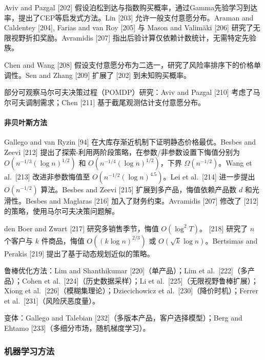 Aviv and Pazgal {[}202{]} 假设泊松到达与指数购买概率，通过Gamma先验学习到达率，提出了CEP等启发式方法。Lin {[}203{]} 允许一般支付意愿分布。Araman and Caldentey {[}204{]}, Farias and van Roy {[}205{]} 与 Mason and Valimäki {[}206{]} 研究了无限视野折扣奖励。Avramidis {[}207{]} 指出后验计算仅依赖计数统计，无需特定先验族。

Chen and Wang {[}208{]} 假设支付意愿分布为二选一，研究了风险率排序下的价格单调性。Sen and Zhang {[}209{]} 扩展了 {[}202{]} 到未知购买概率。

部分可观察马尔可夫决策过程（POMDP）研究：Aviv and Pazgal {[}210{]} 考虑了马尔可夫调制需求；Chen {[}211{]} 基于截尾观测估计支付意愿分布。

\paragraph{非贝叶斯方法}\label{non-bayesian-approaches-1}

Gallego and van Ryzin {[}94{]} 在大库存渐近机制下证明静态价格最优。Besbes and Zeevi {[}212{]} 提出了探索-利用两阶段策略，在参数/非参数设置下悔值分别为 \(O(n^{-1/3}(\log n)^{1/2})\) 和 \(O(n^{-1/4}(\log n)^{1/2})\)，下界 \(\Omega(n^{-1/2})\)。Wang et al.~{[}213{]} 改进非参数悔值至 \(O(n^{-1/2}(\log n)^{4.5})\)。Lei et al.~{[}214{]} 进一步提出 \(O(n^{-1/2})\) 算法。Besbes and Zeevi {[}215{]} 扩展到多产品，悔值依赖产品数 \(d\) 和光滑性。Besbes and Maglaras {[}216{]} 加入了财务约束。Avramidis {[}207{]} 修改了 {[}212{]} 的策略，使用马尔可夫决策问题解。

den Boer and Zwart {[}217{]} 研究多销售季节，悔值 \(O(\log^2 T)\)。{ [}218{]} 研究了 \(n\) 个客户与 \(k\) 件商品，悔值 \(O((k\log n)^{2/3})\) 或 \(O(\sqrt{k}\log n)\)。Bertsimas and Perakis {[}219{]} 提出了基于动态规划近似的策略。

鲁棒优化方法：Lim and Shanthikumar {[}220{]}（单产品）；Lim et al.~{[}222{]}（多产品）；Cohen et al.~{[}224{]}（历史数据采样）；Li et al.~{[}225{]}（无限视野鲁棒扩展）；Xiong et al.~{[}226{]}（模糊集理论）；Dziecichowicz et al.~{[}230{]}（降价时机）；Ferrer et al.~{[}231{]}（风险厌恶度量）。

变体：Gallego and Talebian {[}232{]}（多版本产品，客户选择模型）；Berg and Ehtamo {[}233{]}（多细分市场，随机梯度学习）。

\subsubsection{机器学习方法}\label{machine-learning-approaches}

